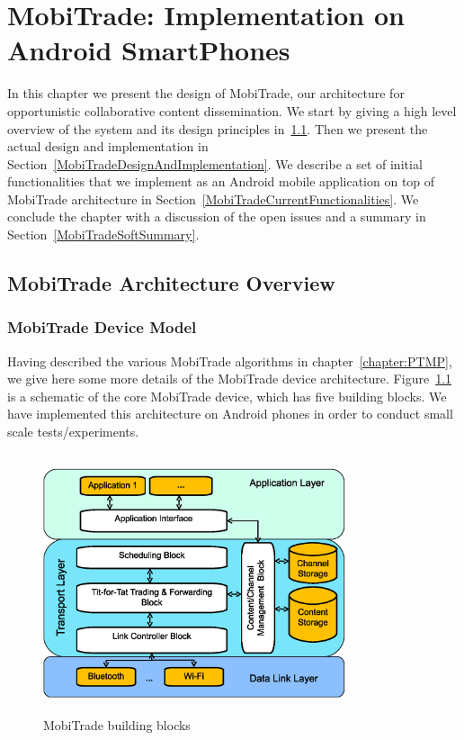 ﻿\chapter{MobiTrade: Implementation on Android SmartPhones}
\label{chapter:MobiTrade}
\minitoc

In this chapter we present the design of MobiTrade, our architecture for opportunistic
collaborative content dissemination. We start by giving a high level overview of the system
and its design principles in~\ref{MobiTradeArchitecture}. Then we present the actual design and implementation
in Section~\ref{MobiTradeDesignAndImplementation}. We describe a set of initial functionalities that we implement as an Android mobile application on top of MobiTrade architecture in Section~\ref{MobiTradeCurrentFunctionalities}. We conclude the chapter with a discussion of the open issues and a summary in Section~\ref{MobiTradeSoftSummary}.


\section{MobiTrade Architecture Overview}
\label{MobiTradeArchitecture}

\subsection{MobiTrade Device Model}
\label{MobiTrade-node}

Having described the various MobiTrade algorithms in chapter~\ref{chapter:PTMP}, we give here some more details of the MobiTrade device architecture. Figure~\ref{MobiTrade-node-architecture} is a schematic of the core MobiTrade device, which has five building blocks. We have  implemented this architecture on Android phones in order to conduct small scale tests/experiments.

\begin{figure}[!h]
\centering
\includegraphics[width=3.5in,height=3in]{Chapitre5/MobiTrade_Node.eps}
\vspace{-0.1in}
\caption{MobiTrade building blocks}
\label{MobiTrade-node-architecture}
\vspace{-0.1in}
\end{figure}

